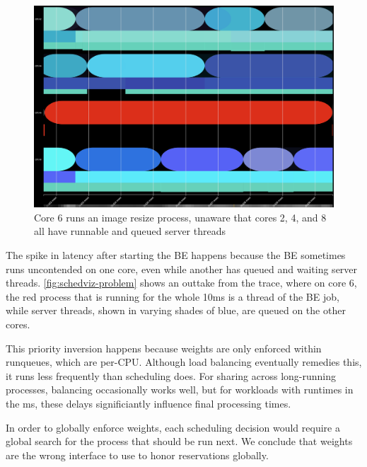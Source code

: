 \begin{figure}[t]
    \centering
    \includegraphics[width=\columnwidth]{graphs/schedviz-problem.png}
    \caption{Core 6 runs an image resize process, unaware that cores 2, 4, and 8
    all have runnable and queued server threads}\label{fig:schedviz-problem}
\end{figure}

The spike in latency after starting the BE happens because the BE sometimes runs
uncontended on one core, even while another has queued and waiting server
threads. \autoref{fig:schedviz-problem} shows an outtake from the trace, where
on core 6, the red process that is running for the whole 10ms is a thread of the
BE job, while server threads, shown in varying shades of blue, are queued on the
other cores.

This priority inversion happens because weights are only enforced within
runqueues, which are per-CPU. Although load balancing eventually remedies this,
it runs less frequently than scheduling does. For sharing across long-running
processes, balancing occasionally works well, but for workloads with runtimes in
the ms, these delays significiantly influence final processing times.

In order to globally enforce weights, each scheduling decision would require a
global search for the process that should be run next. We conclude that weights
are the wrong interface to use to honor reservations globally.




